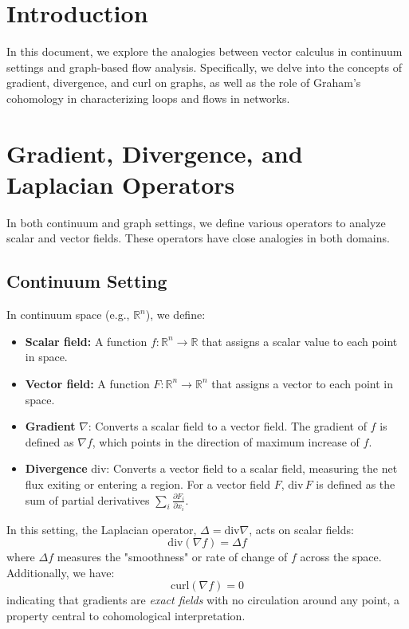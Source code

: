 \documentclass[10pt,a4paper,twocolumn]{article}
\begin{document}
	\section{Introduction}
	In this document, we explore the analogies between vector calculus in continuum settings and graph-based flow analysis. Specifically, we delve into the concepts of gradient, divergence, and curl on graphs, as well as the role of Graham's cohomology in characterizing loops and flows in networks.
	
	\section{Gradient, Divergence, and Laplacian Operators}
	In both continuum and graph settings, we define various operators to analyze scalar and vector fields. These operators have close analogies in both domains.
	
	\subsection{Continuum Setting}
	In continuum space (e.g., $\mathbb{R}^n$), we define:
	\begin{itemize}
		\item \textbf{Scalar field:} A function \( f \colon \mathbb{R}^n \rightarrow \mathbb{R} \) that assigns a scalar value to each point in space.
		\item \textbf{Vector field:} A function \( F \colon \mathbb{R}^n \rightarrow \mathbb{R}^n \) that assigns a vector to each point in space.
		\item \textbf{Gradient} \( \nabla \): Converts a scalar field to a vector field. The gradient of \( f \) is defined as \( \nabla f \), which points in the direction of maximum increase of \( f \).
		\item \textbf{Divergence} \( \text{div} \): Converts a vector field to a scalar field, measuring the net flux exiting or entering a region. For a vector field \( F \), \( \text{div} \, F \) is defined as the sum of partial derivatives \( \sum_{i} \frac{\partial F_i}{\partial x_i} \).
	\end{itemize}
	
	In this setting, the Laplacian operator, \( \Delta = \text{div} \nabla \), acts on scalar fields:
	\[
	\text{div}(\nabla f) = \Delta f
	\]
	where \( \Delta f \) measures the "smoothness" or rate of change of \( f \) across the space. Additionally, we have:
	\[
	\text{curl}(\nabla f) = 0
	\]
	indicating that gradients are \textit{exact fields} with no circulation around any point, a property central to cohomological interpretation.
	
\end{document}
